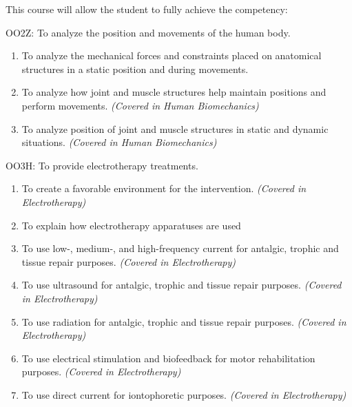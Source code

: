 {This course will allow the student to fully achieve the competency:

OO2Z:  To analyze the position and movements of the human body.
\begin{enumerate}
\item To analyze the mechanical forces and constraints placed on anatomical structures in a static position and during movements.
\item To analyze how joint and muscle structures help maintain positions and perform movements.  {\itshape (Covered in Human Biomechanics)}
\item To analyze position of joint and muscle structures in static and dynamic situations.  {\itshape (Covered in Human Biomechanics)}
\end{enumerate}
\smallskip

OO3H:	To provide electrotherapy treatments.
\begin{enumerate}
\item To create a favorable environment for the intervention.  {\itshape(Covered in Electrotherapy)}
\item To explain how electrotherapy apparatuses are used
\item To use low-, medium-, and high-frequency current for antalgic, trophic and tissue repair purposes.   {\itshape(Covered in Electrotherapy)}
\item To use ultrasound for antalgic, trophic and tissue repair purposes.  {\itshape(Covered in Electrotherapy)}
\item To use radiation for antalgic, trophic and tissue repair purposes. {\itshape (Covered in Electrotherapy)}
\item To use electrical stimulation and biofeedback for motor rehabilitation purposes.  {\itshape(Covered in Electrotherapy)}
\item To use direct current for iontophoretic purposes.  {\itshape(Covered in Electrotherapy)}
\end{enumerate}
}